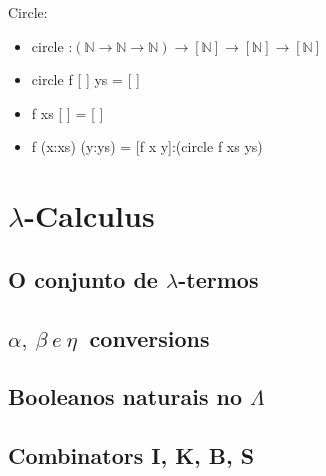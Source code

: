 \documentclass[12pt, a4paper]{article}
\begin{document}
			Circle:
			\begin{itemize}
			\item circle :$(\mathbb{N} \rightarrow \mathbb{N} \rightarrow \mathbb{N}) \rightarrow [\mathbb{N}] \rightarrow [\mathbb{N}] \rightarrow [\mathbb{N}]$
			\item circle f [ ] ys = [ ]
			\item f xs [ ] = [ ]
			\item f (x:xs) (y:ys) = [f x y]:(circle f xs ys)\\
			\end{itemize}

	\section{$\lambda$-Calculus}
	\label{sec:lambda}
		\subsection{O conjunto de $\lambda$-termos}
		\subsection{$\alpha,~ \beta~ e~ \eta~$ conversions}
		\subsection{Booleanos naturais no $\Lambda$}
		\subsection{Combinators I, K, B, S}
\end{document}
